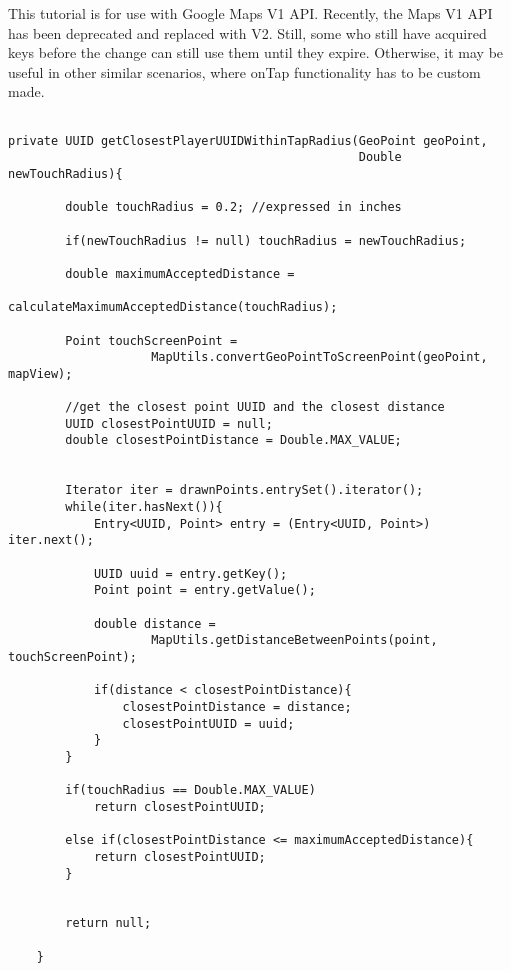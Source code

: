 
This tutorial is for use with Google Maps V1 API. Recently, the Maps V1 API has
been deprecated and replaced with V2. Still, some who still have acquired keys
before the change can still use them until they expire. Otherwise, it
may be useful in other similar scenarios, where onTap functionality
has to be custom made.\newline
\begin{verbatim}

private UUID getClosestPlayerUUIDWithinTapRadius(GeoPoint geoPoint,
												 Double newTouchRadius){
		
		double touchRadius = 0.2; //expressed in inches
		
		if(newTouchRadius != null) touchRadius = newTouchRadius;		 
				
		double maximumAcceptedDistance = 
								calculateMaximumAcceptedDistance(touchRadius);
		
		Point touchScreenPoint = 
					MapUtils.convertGeoPointToScreenPoint(geoPoint, mapView);
		
		//get the closest point UUID and the closest distance
		UUID closestPointUUID = null;
		double closestPointDistance = Double.MAX_VALUE;
			
		
		Iterator iter = drawnPoints.entrySet().iterator();
		while(iter.hasNext()){			
			Entry<UUID, Point> entry = (Entry<UUID, Point>) iter.next();
			
			UUID uuid = entry.getKey();
			Point point = entry.getValue();
			
			double distance = 
					MapUtils.getDistanceBetweenPoints(point, touchScreenPoint);
			
			if(distance < closestPointDistance){
				closestPointDistance = distance;
				closestPointUUID = uuid;		
			}
		}
		
		if(touchRadius == Double.MAX_VALUE) 
			return closestPointUUID;
		
		else if(closestPointDistance <= maximumAcceptedDistance){
			return closestPointUUID;
		}
		
		
		return null;
		
	}
	
\end{verbatim}
